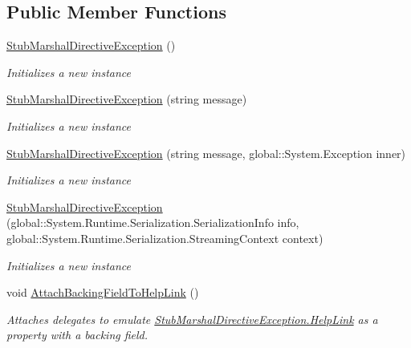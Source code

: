 \subsection*{Public Member Functions}
\begin{DoxyCompactItemize}
\item 
\hyperlink{class_system_1_1_runtime_1_1_interop_services_1_1_fakes_1_1_stub_marshal_directive_exception_abf1a13a899ef62101481c49a3cf27906}{Stub\-Marshal\-Directive\-Exception} ()
\begin{DoxyCompactList}\small\item\em Initializes a new instance\end{DoxyCompactList}\item 
\hyperlink{class_system_1_1_runtime_1_1_interop_services_1_1_fakes_1_1_stub_marshal_directive_exception_a2765c7873aceaac61649801321656aed}{Stub\-Marshal\-Directive\-Exception} (string message)
\begin{DoxyCompactList}\small\item\em Initializes a new instance\end{DoxyCompactList}\item 
\hyperlink{class_system_1_1_runtime_1_1_interop_services_1_1_fakes_1_1_stub_marshal_directive_exception_aa7bdafa8440b8404db28da1fe1c3b3f9}{Stub\-Marshal\-Directive\-Exception} (string message, global\-::\-System.\-Exception inner)
\begin{DoxyCompactList}\small\item\em Initializes a new instance\end{DoxyCompactList}\item 
\hyperlink{class_system_1_1_runtime_1_1_interop_services_1_1_fakes_1_1_stub_marshal_directive_exception_af71d507ef0f66ff0eae5ca218e20a088}{Stub\-Marshal\-Directive\-Exception} (global\-::\-System.\-Runtime.\-Serialization.\-Serialization\-Info info, global\-::\-System.\-Runtime.\-Serialization.\-Streaming\-Context context)
\begin{DoxyCompactList}\small\item\em Initializes a new instance\end{DoxyCompactList}\item 
void \hyperlink{class_system_1_1_runtime_1_1_interop_services_1_1_fakes_1_1_stub_marshal_directive_exception_a4754018a00ed24348e4f927a8ce2199c}{Attach\-Backing\-Field\-To\-Help\-Link} ()
\begin{DoxyCompactList}\small\item\em Attaches delegates to emulate \hyperlink{class_system_1_1_runtime_1_1_interop_services_1_1_fakes_1_1_stub_marshal_directive_exception_a562ff8eaefad108fb749b15fe7926b5b}{Stub\-Marshal\-Directive\-Exception.\-Help\-Link} as a property with a backing field.\end{DoxyCompactList}\item 

\end{DoxyCompactItemize}
